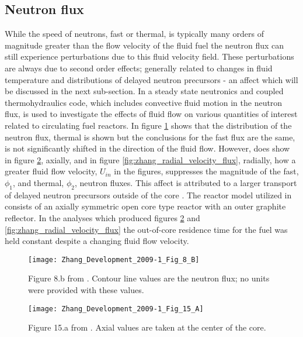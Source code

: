 \documentclass[review]{elsarticle}
\begin{document}
\subsection{Neutron flux} \label{ssec:flux}
While the speed of neutrons, fast or thermal, is typically many orders of magnitude greater than
the flow velocity of the fluid fuel the neutron flux can still experience
perturbations due to this fluid velocity field. These perturbations are always
due to second order effects; generally related to changes in fluid temperature
and distributions of delayed neutron precursors - an affect which will be
discussed in the next sub-section. In \cite{zhang_development_2009-1} a steady
state neutronics and coupled thermohydraulics code, which includes convective
fluid motion in the neutron flux, is used to investigate the effects of fluid
flow on various quantities of interest related to circulating fuel reactors. In
figure \ref{fig:zhang_2d_flux} \cite{zhang_development_2009-1} shows that the
distribution of the neutron flux, thermal is shown but the conclusions for the fast flux are the same, is not significantly shifted in the direction
of the fluid flow. However, \cite{zhang_development_2009-1} does show in figure \ref{fig:zhang_axial_velocity_flux}, axially, and in figure \ref{fig:zhang_radial_velocity_flux}, radially, how a greater fluid flow
 velocity, $U_{in}$ in the figures, suppresses the magnitude of the fast, $\phi_{1}$, and thermal, $\phi_{2}$, neutron fluxes. This affect is
 attributed to a larger transport of delayed neutron precursors outside of the core \cite{zhang_development_2009-1}. The reactor model
 utilized in \cite{zhang_development_2009-1} consists of an axially symmetric
 open core type reactor with an outer graphite reflector. In the analyses which
 produced figures \ref{fig:zhang_axial_velocity_flux} and \ref{fig:zhang_radial_velocity_flux} the
 out-of-core residence time for the fuel was held constant despite a changing
 fluid flow velocity.

\begin{figure}[h]
   \centering
   \texttt{[image: Zhang\_Development\_2009-1\_Fig\_8\_B]}
   \caption{Figure 8.b from \cite{zhang_development_2009-1}. Contour line
    values are the neutron flux; no units were provided with these values.} 
   \label{fig:zhang_2d_flux}
\end{figure}

\begin{figure}[h]
   \centering
   \texttt{[image: Zhang\_Development\_2009-1\_Fig\_15\_A]}
   \caption{Figure 15.a from \cite{zhang_development_2009-1}. 
               Axial
               values are taken at the center of the core.}
   \label{fig:zhang_axial_velocity_flux}
\end{figure}
\end{document}
